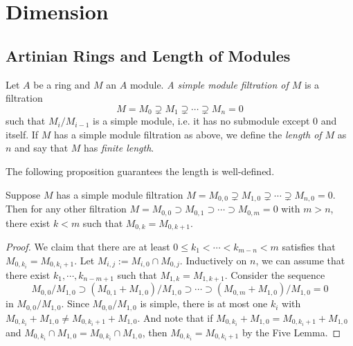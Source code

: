 \section{Dimension}

    \subsection{Artinian Rings and Length of Modules}

        \begin{definition}\label{def: length of a module}
            Let $A$ be a ring and $M$ an $A$ module.
            \textit{A simple module filtration of $M$} is a filtration
            \[ M = M_0 \supsetneq M_1 \supsetneq \cdots \supsetneq M_n = 0 \] 
            such that $M_i/M_{i-1}$ is a simple module, i.e. it has no submodule except $0$ and itself.
            If $M$ has a simple module filtration as above, we define the \textit{length of $M$} as $n$ and say that $M$ has \textit{finite length}.
        \end{definition}

        The following proposition guarantees the length is well-defined.

        \begin{proposition}\label{prop: length of a module is well defined}
            Suppose $M$ has a simple module filtration $M = M_{0,0} \supsetneq M_{1,0} \supsetneq \cdots \supsetneq M_{n,0} = 0$.
            Then for any other filtration $M = M_{0,0} \supset M_{0,1} \supset \cdots \supset M_{0,m} = 0$ with $m > n$, there exist $k<m$ such that $M_{0,k} = M_{0,k+1}$.
        \end{proposition}
        \begin{proof}
            We claim that there are at least $0\leq k_1<\cdots<k_{m-n}<m$ satisfies that $M_{0,k_i} = M_{0,k_i+1}$.
            Let $M_{i,j} := M_{i,0} \cap M_{0,j}$.
            Inductively on $n$, we can assume that there exist $k_1,\cdots,k_{n-m+1}$ such that $M_{1,k} = M_{1,k+1}$.
            Consider the sequence 
            \[ M_{0,0}/M_{1,0} \supset (M_{0,1}+M_{1,0})/M_{1,0} \supset \cdots \supset (M_{0,m}+M_{1,0})/M_{1,0} = 0 \]
            in $M_{0,0}/M_{1,0}$.
            Since $M_{0,0}/M_{1,0}$ is simple, there is at most one $k_i$ with $M_{0,k_i}+M_{1,0} \neq M_{0,k_i+1}+M_{1,0}$.
            And note that if $M_{0,k_i} + M_{1,0} = M_{0,k_i+1}+M_{1,0}$ and $M_{0,k_i} \cap M_{1,0} = M_{0,k_i} \cap M_{1,0}$, then $M_{0,k_i} = M_{0,k_i+1}$ by the Five Lemma.
        \end{proof}

